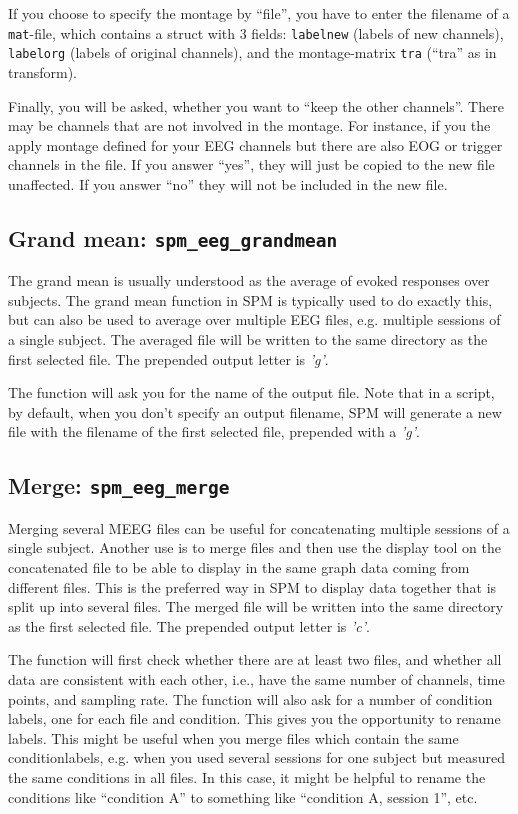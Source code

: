 If you choose to specify the montage by ``file'', you have to enter the filename of a \texttt{mat}-file, which contains a struct with 3 fields: \texttt{labelnew} (labels of new channels), \texttt{labelorg} (labels of original channels), and the montage-matrix \texttt{tra} (``tra'' as in transform).

Finally, you will be asked, whether you want to ``keep the other channels''. There may be channels that are not involved in the montage. For instance, if you the apply montage defined for your EEG channels but there are also EOG or trigger channels in the file. If you answer ``yes'', they will just be copied to the new file unaffected. If you answer ``no'' they will not be included in the new file.


\subsection{Grand mean: \texttt{spm\_eeg\_grandmean}}
The grand mean is usually understood as the average of evoked responses over subjects. The grand mean function in SPM is typically used to do exactly this, but can also be used to average over multiple EEG files, e.g. multiple sessions of a single subject. The averaged file will be written to the same directory as the first selected file. The prepended output letter is \textit{'g'}.

The function will ask you for the name of the output file. Note that in a script, by default, when you don't specify an output filename, SPM will generate a new file with the filename of the first selected file, prepended with a \textit{'g'}.

\subsection{Merge: \texttt{spm\_eeg\_merge}}
Merging several MEEG files can be useful for concatenating multiple sessions of a single subject. Another use is to merge files and then use the display tool on the concatenated file to be able to display in the same graph data coming from different files. This is the preferred way in SPM to display data together that is split up into several files. The merged file will be written into the same directory as the first selected file. The prepended output letter is \textit{'c'}.

The function will first check whether there are at least two files, and whether all data are consistent with each other, i.e., have the same number of channels, time points, and sampling rate. The function will also ask for a number of condition labels, one for each file and condition. This gives you the opportunity to rename labels. This might be useful when you merge files which contain the same conditionlabels, e.g. when you used several sessions for one subject but measured the same conditions in all files. In this case, it might be helpful to rename the conditions like ``condition A'' to something like ``condition A, session 1'', etc.

